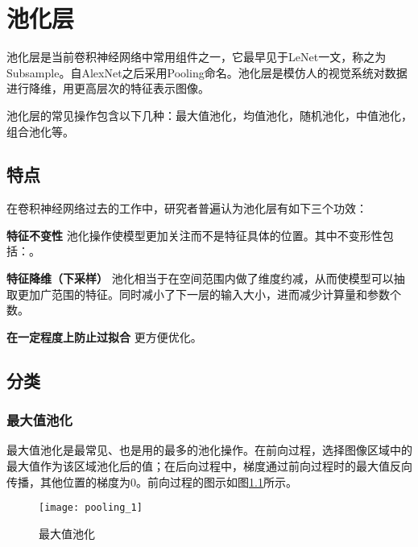 \chapter{池化层}

池化层是当前卷积神经网络中常用组件之一，它最早见于LeNet一文，称之为Subsample。自AlexNet之后采用Pooling命名。池化层是模仿人的视觉系统对数据进行降维，用更高层次的特征表示图像\cite{RN3}。

池化层的常见操作包含以下几种：最大值池化，均值池化，随机池化，中值池化，组合池化等。

    \section{特点}
    
    在卷积神经网络过去的工作中，研究者普遍认为池化层有如下三个功效\cite{RN4}：
    
    \textbf{特征不变性} \quad 池化操作使模型更加关注而不是特征具体的位置。其中不变形性包括：。
    
    \textbf{特征降维（下采样）} \quad 池化相当于在空间范围内做了维度约减，从而使模型可以抽取更加广范围的特征。同时减小了下一层的输入大小，进而减少计算量和参数个数。
    
    \textbf{在一定程度上防止过拟合} \quad 更方便优化。
    
    
    \section{分类}
    \subsection{最大值池化}
    
    最大值池化是最常见、也是用的最多的池化操作。​在前向过程，选择图像区域中的最大值作为该区域池化后的值；在后向过程中，梯度通过前向过程时的最大值反向传播，其他位置的梯度为0。前向过程的图示如图\ref{fig:11}所示。
    
    \begin{figure}[!htbp]
        \centering
        \texttt{[image: pooling\_1]}
        \caption{最大值池化 \cite{RN5}}
        \label{fig:11}
    \end{figure}